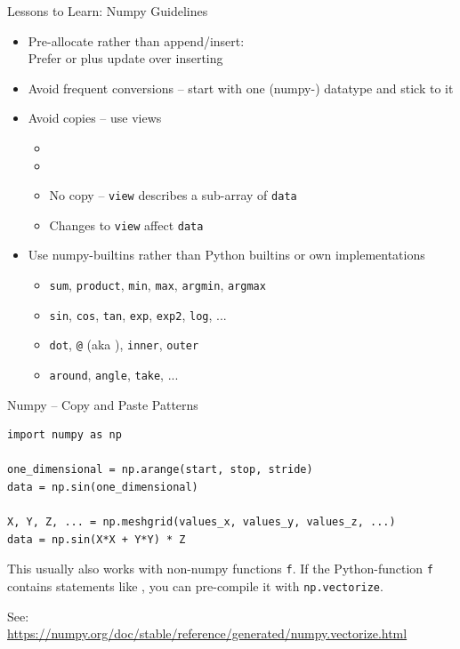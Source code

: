 \begin{frame}{Lessons to Learn: Numpy Guidelines}
%
\begin{itemize}
\item Pre-allocate rather than append/insert:\\
	Prefer  or  plus update over inserting 
\item Avoid frequent conversions -- start with one (numpy-) datatype and stick to it
\item Avoid copies -- use views
	\begin{itemize}
	\item {}
	\item {}
	\item No copy -- \texttt{view} describes a sub-array of \texttt{data}
	\item Changes to \texttt{view} affect \texttt{data}
	\end{itemize}
\item Use numpy-builtins rather than Python builtins or own implementations
	\begin{itemize}
	\item \texttt{sum}, \texttt{product}, \texttt{min}, \texttt{max}, \texttt{argmin}, \texttt{argmax}
	\item \texttt{sin}, \texttt{cos}, \texttt{tan}, \texttt{exp}, \texttt{exp2}, \texttt{log}, ...
	\item \texttt{dot}, \texttt{@} (aka ), \texttt{inner}, \texttt{outer}
	\item \texttt{around}, \texttt{angle}, \texttt{take}, ...
	\end{itemize}
\end{itemize}
%
\end{frame}

%
\begin{frame}[fragile]{Numpy -- Copy and Paste Patterns}
%
\begin{codebox}
\begin{verbatim}
import numpy as np

one_dimensional = np.arange(start, stop, stride)
data = np.sin(one_dimensional)

X, Y, Z, ... = np.meshgrid(values_x, values_y, values_z, ...)
data = np.sin(X*X + Y*Y) * Z
\end{verbatim}
\end{codebox}
%
\begin{hintbox}
\small
This usually also works with non-numpy functions \texttt{f}.
If the Python-function \texttt{f} contains statements like , you can pre-compile it with \texttt{np.vectorize}.

\vspace{6pt}
See:\\
\url{https://numpy.org/doc/stable/reference/generated/numpy.vectorize.html}
\end{hintbox}
%
\end{frame}

